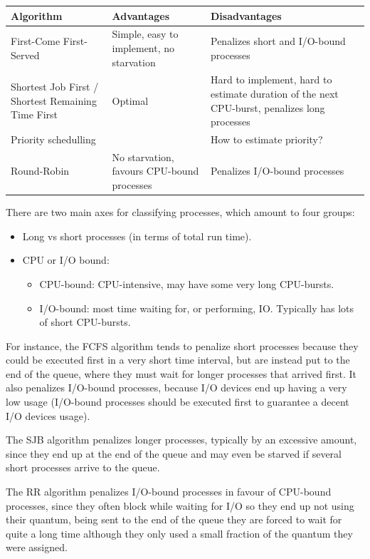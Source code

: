 \documentclass{sope}
\begin{document}
\begin{center}
\begin{tabular}{p{25mm} | p{60mm} | p{60mm}}
    \textbf{Algorithm} & \textbf{Advantages} & \textbf{Disadvantages} \\ \hline
    First-Come First-Served & Simple, easy to implement, no starvation & Penalizes short and I/O-bound processes \\ \hline
    Shortest Job First / Shortest Remaining Time First & Optimal & Hard to implement, hard to estimate duration of the next CPU-burst, penalizes long processes \\ \hline
    Priority schedulling & & How to estimate priority? \\ \hline
    Round-Robin & No starvation, favours CPU-bound processes & Penalizes I/O-bound processes
\end{tabular}
\end{center}
There are two main axes for classifying processes, which amount to four groups:
\begin{itemize}
    \item Long vs short processes (in terms of total run time).
    \item CPU or I/O bound:
    \begin{itemize}
        \item CPU-bound: CPU-intensive, may have some very long CPU-bursts.
        \item I/O-bound: most time waiting for, or performing, IO. Typically has lots of short CPU-bursts.
    \end{itemize}
\end{itemize}
For instance, the FCFS algorithm tends to penalize short processes because they could be executed first in a very short time interval, but are instead put to the end of the queue, where they must wait for longer processes that arrived first. It also penalizes I/O-bound processes, because I/O devices end up having a very low usage (I/O-bound processes should be executed first to guarantee a decent I/O devices usage).

The SJB algorithm penalizes longer processes, typically by an excessive amount, since they end up at the end of the queue and may even be starved if several short processes arrive to the queue.

The RR algorithm penalizes I/O-bound processes in favour of CPU-bound processes, since they often block while waiting for I/O so they end up not using their quantum, being sent to the end of the queue they are forced to wait for quite a long time although they only used a small fraction of the quantum they were assigned.
\end{document}
